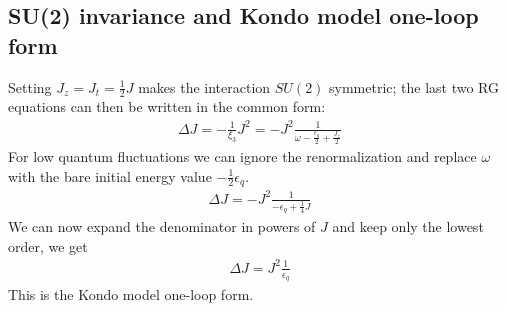 \documentclass[twoside]{report}
\numberwithin{equation}{section}
\begin{document}
\subsection{SU(2) invariance and Kondo model one-loop form}
Setting \(J_z = J_t = \frac{1}{2} J\) makes the interaction \(SU(2)\) symmetric; the last two RG equations can then be written in the common form:
\begin{equation}\begin{aligned}
\Delta J = -\frac{1}{\xi_3}J^2 = -J^2\frac{1}{\omega - \frac{\epsilon_q}{2} + \frac{J_z}{2}}
\end{aligned}\end{equation}
For low quantum fluctuations we can ignore the renormalization and replace \(\omega\) with the bare initial energy value \(-\frac{1}{2}\epsilon_q\).
\begin{equation}\begin{aligned}
\Delta J = - J^2 \frac{1}{-\epsilon_q + \frac{1}{4}J}
\end{aligned}\end{equation}
We can now expand the denominator in powers of \(J\) and keep only the lowest order, we get
\begin{equation}\begin{aligned}
\Delta J = J^2 \frac{1}{\epsilon_q}
\end{aligned}\end{equation}
This is the Kondo model one-loop form.
\end{document}
